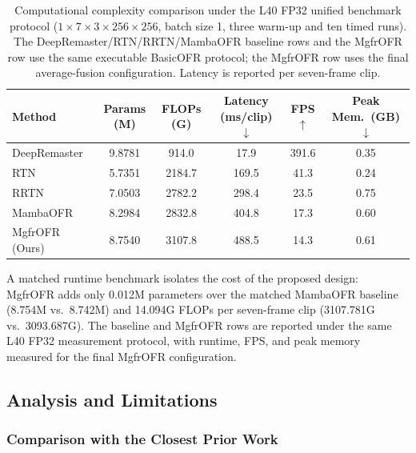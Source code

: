 \begin{table}[htbp]
\caption{Computational complexity comparison under the L40 FP32 unified benchmark protocol ($1{\times}7{\times}3{\times}256{\times}256$, batch size 1, three warm-up and ten timed runs). The DeepRemaster/RTN/RRTN/MambaOFR baseline rows and the MgfrOFR row use the same executable BasicOFR protocol; the MgfrOFR row uses the final average-fusion configuration. Latency is reported per seven-frame clip.\label{tab:complexity}}
\begin{tabularx}{\textwidth}{lCCCCC}
\toprule
\textbf{Method} & \textbf{Params (M)} & \textbf{FLOPs (G)} & \textbf{Latency (ms/clip)$\downarrow$} & \textbf{FPS$\uparrow$} & \textbf{Peak Mem.\ (GB)$\downarrow$} \\
\midrule
DeepRemaster~\cite{iizuka2019deepremaster}   & 9.8781 & 914.0  & 17.9  & 391.6 & 0.35 \\
RTN~\cite{wan2022rtn}                        & 5.7351 & 2184.7 & 169.5 & 41.3  & 0.24 \\
RRTN~\cite{lin2024rrtn}                      & 7.0503 & 2782.2 & 298.4 & 23.5  & 0.75 \\
MambaOFR~\cite{mao2025mambaofr}              & 8.2984 & 2832.8 & 404.8 & 17.3  & 0.60 \\
\midrule
MgfrOFR (Ours)                              & 8.7540 & 3107.8 & 488.5 & 14.3  & 0.61 \\
\bottomrule
\end{tabularx}
\end{table}

A matched runtime benchmark isolates the cost of the proposed design: MgfrOFR adds only 0.012M parameters over the matched MambaOFR baseline (8.754M vs.\ 8.742M) and 14.094G FLOPs per seven-frame clip (3107.781G vs.\ 3093.687G). The baseline and MgfrOFR rows are reported under the same L40 FP32 measurement protocol, with runtime, FPS, and peak memory measured for the final MgfrOFR configuration.

\FloatBarrier
\subsection{Analysis and Limitations}
\label{subsec:analysis_limitations}

\subsubsection{Comparison with the Closest Prior Work}
\label{subsec:vs_mambaofr}

